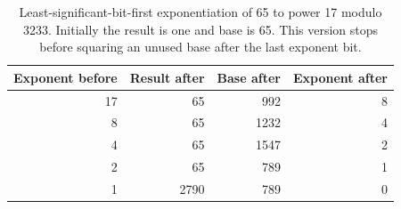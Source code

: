 \begin{table}[!ht]
  \centering
  \begin{tabular}{r r r r}
    \toprule
    Exponent before & Result after & Base after & Exponent after \\
    \midrule
    17              & 65           & 992        & 8              \\
    8               & 65           & 1232       & 4              \\
    4               & 65           & 1547       & 2              \\
    2               & 65           & 789        & 1              \\
    1               & 2790         & 789        & 0              \\
    \bottomrule
  \end{tabular}
  \caption{Least-significant-bit-first exponentiation of 65 to power 17 modulo 3233. Initially the result is one and base is 65. This version stops before squaring an unused base after the last exponent bit.}
  \label{tab:revision-rsa-power}
\end{table}
